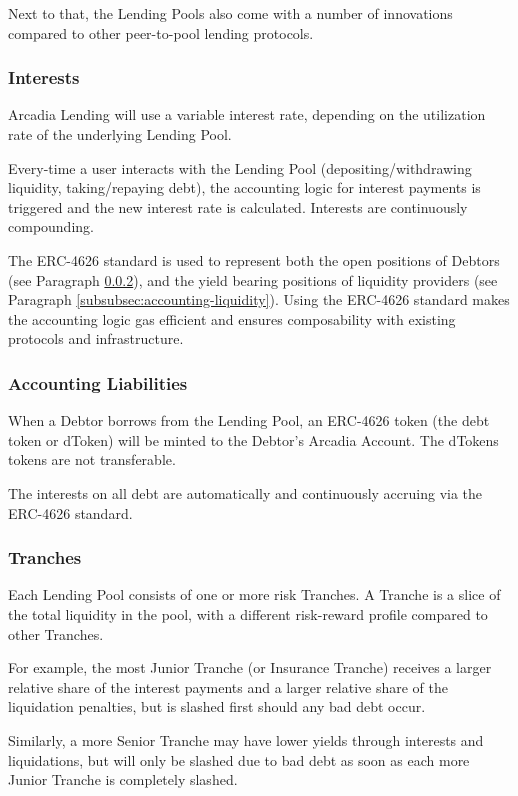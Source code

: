 \documentclass[sigconf,nonacm]{acmart}
\begin{document}
Next to that, the Lending Pools also come with a number of innovations compared to other peer-to-pool lending protocols.

\subsubsection{Interests}
Arcadia Lending will use a variable interest rate, depending on the utilization rate of the underlying Lending Pool.

Every-time a user interacts with the Lending Pool (depositing/withdrawing liquidity, taking/repaying debt),
the accounting logic for interest payments is triggered and the new interest rate is calculated.
Interests are continuously compounding.

The ERC-4626 standard is used to represent both the open positions of Debtors (see Paragraph \ref{subsubsec:accounting-liabilities}),
and the yield bearing positions of liquidity providers (see Paragraph \ref{subsubsec:accounting-liquidity}).
Using the ERC-4626 standard makes the accounting logic gas efficient and ensures composability with existing protocols and infrastructure.

\subsubsection{Accounting Liabilities}
\label{subsubsec:accounting-liabilities}
When a Debtor borrows from the Lending Pool,
an ERC-4626 token (the debt token or dToken) will be minted to the Debtor's Arcadia Account.
The dTokens tokens are not transferable.

The interests on all debt are automatically and continuously accruing via the ERC-4626 standard.

\subsubsection{Tranches}
Each Lending Pool consists of one or more risk Tranches.
A Tranche is a slice of the total liquidity in the pool, with a different risk-reward profile compared to other Tranches.

For example, the most Junior Tranche (or Insurance Tranche) receives a larger relative share of the interest payments and a larger relative share of the liquidation penalties,
but is slashed first should any bad debt occur.

Similarly, a more Senior Tranche may have lower yields through interests and liquidations,
but will only be slashed due to bad debt as soon as each more Junior Tranche is completely slashed.
\end{document}
